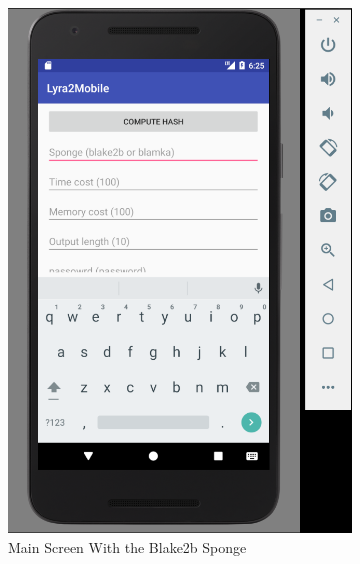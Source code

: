 \begin{figure}[H]
\centering
\begin{subfigure}{.5\textwidth}
  \centering
  \includegraphics[width=.8\linewidth]{figures/lyra2-mobile-main-clean}
  \caption{Main Screen With the Blake2b Sponge}
  \label{fig:lyra2-mobile-main-blake2b}
\end{subfigure}%
\begin{subfigure}{.5\textwidth}
  \centering

\end{subfigure}
\end{figure}
